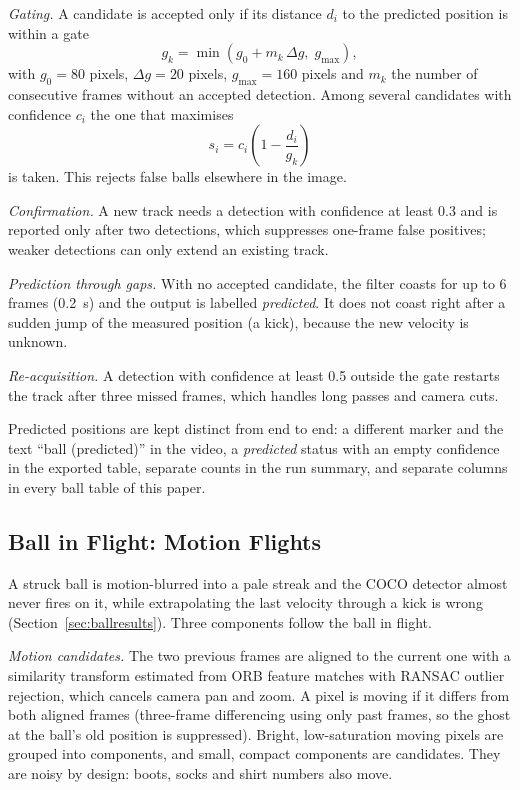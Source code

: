 \documentclass[conference]{IEEEtran}
\begin{document}
\emph{Gating.} A candidate is accepted only if its distance $d_{i}$ to the
predicted position is within a gate
\begin{equation}
g_{k}=\min\left(g_{0}+m_{k}\,\Delta g,\; g_{\max}\right),
\label{eq:gate}
\end{equation}
with $g_{0}=80$ pixels, $\Delta g=20$ pixels, $g_{\max}=160$ pixels and $m_{k}$ the
number of consecutive frames without an accepted detection. Among several candidates with confidence
$c_{i}$ the one that maximises
\begin{equation}
s_{i}=c_{i}\left(1-\frac{d_{i}}{g_{k}}\right)
\label{eq:score}
\end{equation}
is taken. This rejects false balls elsewhere in the image.

\emph{Confirmation.} A new track needs a detection with confidence at least 0.3
and is reported only after two detections, which suppresses one-frame false
positives; weaker detections can only extend an existing track.

\emph{Prediction through gaps.} With no accepted candidate, the filter coasts for
up to 6 frames (0.2~s) and the output is labelled \emph{predicted}. It does not
coast right after a sudden jump of the measured position (a kick), because the new
velocity is unknown.

\emph{Re-acquisition.} A detection with confidence at least 0.5 outside the gate
restarts the track after three missed frames, which handles long passes and
camera cuts.

Predicted positions are kept distinct from end to end: a different marker and the
text ``ball (predicted)'' in the video, a \emph{predicted} status with an empty
confidence in the exported table, separate counts in the run summary, and
separate columns in every ball table of this paper.

\subsection{Ball in Flight: Motion Flights}
A struck ball is motion-blurred into a pale streak and the COCO detector almost
never fires on it, while extrapolating the last velocity through a kick is wrong
(Section~\ref{sec:ballresults}). Three components follow the ball in flight.

\emph{Motion candidates.} The two previous frames are aligned to the current one
with a similarity transform estimated from ORB feature matches with RANSAC
outlier rejection, which cancels camera pan and zoom. A pixel is moving if it
differs from both aligned frames (three-frame differencing using only past frames,
so the ghost at the ball's old position is suppressed). Bright, low-saturation
moving pixels are grouped into components, and small, compact components are
candidates. They are noisy by design: boots, socks and shirt numbers also move.
\end{document}
